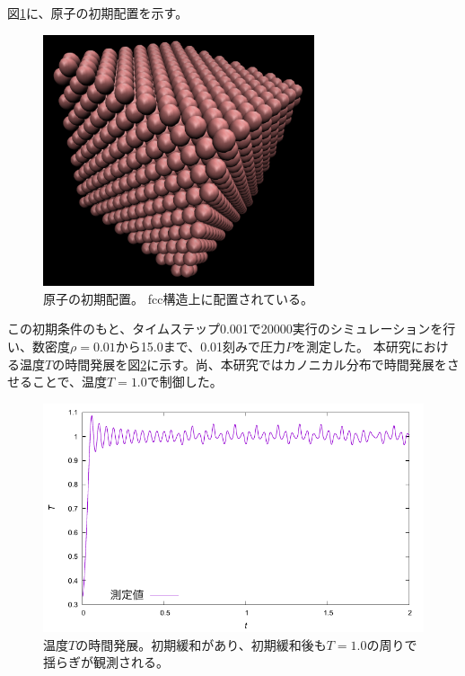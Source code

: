 \documentclass[titlepage]{jsreport}
\begin{document}
{{{\newpage
図\ref{fig:initial-state-molecule}に、原子の初期配置を示す。

\begin{figure}[htbp]
    \begin{center}
        \includegraphics[width=8cm]{fig/initial-state-molecule.png}
    \end{center}
    \caption{原子の初期配置。
    fcc構造上に配置されている。}
    \label{fig:initial-state-molecule}
\end{figure}


この初期条件のもと、タイムステップ0.001で20000実行のシミュレーションを行い、数密度$\rho=0.01$から15.0まで、0.01刻みで圧力$P$を測定した。
本研究における温度$T$の時間発展を図\ref{fig:d2.0-tt.pdf}に示す。尚、本研究ではカノニカル分布で時間発展をさせることで、温度$T=1.0$で制御した。

\begin{figure}[htbp]
    \begin{center}
        \includegraphics[width=12cm]{fig/d2.0-tt.pdf}
    \end{center}
    \caption{温度$T$の時間発展。初期緩和があり、初期緩和後も$T=1.0$の周りで揺らぎが観測される。}
    \label{fig:d2.0-tt.pdf}
\end{figure}

}}}
\end{document}
